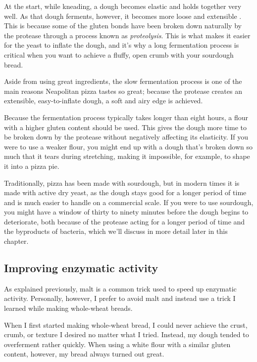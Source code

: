 At the start, while kneading, a dough becomes elastic and holds together very
well. As that dough ferments, however, it becomes more loose and extensible
\cite{protease+enzyme+bread}. This is because some of the gluten bonds have
been broken down naturally by the protease through a process known as
\textit{proteolysis}. This is what makes it easier for the yeast to inflate the
dough, and it's why a long fermentation process is critical when you want to
achieve a fluffy, open crumb with your sourdough bread.

Aside from using great ingredients, the slow fermentation process is one of the
main reasons Neapolitan pizza tastes so great; because the protease creates an
extensible, easy-to-inflate dough, a soft and airy edge is achieved.

Because the fermentation process typically takes longer than eight hours, a
flour with a higher gluten content should be used. This gives the dough more
time to be broken down by the protease without negatively affecting its
elasticity. If you were to use a weaker flour, you might end up with a dough
that's broken down so much that it tears during stretching, making it
impossible, for example, to shape it into a pizza pie.

Traditionally, pizza has been made with sourdough, but in modern times it is
made with active dry yeast, as the dough stays good for a longer period of time
and is much easier to handle on a commercial scale. If you were to use
sourdough, you might have a window of thirty to ninety minutes before the dough
begins to deteriorate, both because of the protease acting for a longer period
of time and the byproducts of bacteria, which we'll discuss in more detail later
in this chapter.

\subsection{Improving enzymatic activity}

As explained previously, malt is a common trick used to speed up enzymatic
activity. Personally, however, I prefer to avoid malt and instead use a
trick I learned while making whole-wheat breads.

When I first started making whole-wheat bread, I could never achieve the
crust, crumb, or texture I desired no matter what I tried. Instead, my dough
tended to overferment rather quickly. When using a white flour with a similar
gluten content, however, my bread always turned out great.

